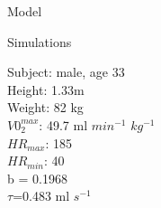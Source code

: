 \documentclass[final]{beamer}
\theoremstyle{definition}
\begin{document}
\begin{frame}[fragile]
\begin{textblock}{51}
\begin{block}{Model}
\begin{multicols}{2}
\end{multicols}



\end{block}

\begin{block}{Simulations}
\begin{multicols}{3}
Subject: male, age 33\\
Height: 1.33m\\ 
Weight: 82 kg \\\columnbreak
$V0_{2}^{max}$: 49.7 ml $min^{-1}$ $kg^{-1}$ \\
$HR_{max}$: 185 \\
$HR_{min}$: 40\\\columnbreak
b = 0.1968\\
$\tau$=0.483 ml $s^{-1}$
\end{multicols}


\end{block}
\end{textblock}
\end{frame}
\end{document}
